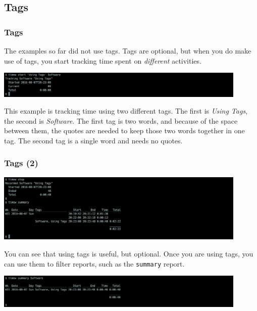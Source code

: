 \documentclass[t,handout]{beamer}
\begin{document}
\subsection{Tags}

\begin{frame}[fragile]\frametitle{Tags}
    The examples so far did not use tags. Tags are optional, but when you do make use of tags, you start tracking time spent on \textit{different} activities.

    \includegraphics[width=12cm]{images/tutorial8.png}

    This example is tracking time using two different tags. The first is \textit{Using Tags}, the second is \textit{Software}. The first tag is two words, and because of the space between them, the quotes are needed to keep those two words together in one tag. The second tag is a single word and needs no quotes.
\end{frame}

\begin{frame}[fragile]\frametitle{Tags (2)}
    \includegraphics[width=12cm]{images/tutorial9.png}

    You can see that using tags is useful, but optional. Once you are using tags, you can use them to filter reports, such as the \verb=summary= report.

    \includegraphics[width=12cm]{images/tutorial10.png}
\end{frame}
\end{document}
